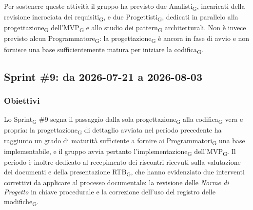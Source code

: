 ﻿\documentclass[a4paper, 10pt, colorlinks=true, linkcolor=black, urlcolor=blue, citecolor=blue, hidelinks]{article}
\begin{document}
Per sostenere queste attività il gruppo ha previsto due Analisti\textsubscript{G}, incaricati della revisione incrociata dei requisiti\textsubscript{G}, e due Progettisti\textsubscript{G}, dedicati in parallelo alla progettazione\textsubscript{G} dell'MVP\textsubscript{G} e allo studio dei pattern\textsubscript{G} architetturali. Non è invece previsto alcun Programmatore\textsubscript{G}: la progettazione\textsubscript{G} è ancora in fase di avvio e non fornisce una base sufficientemente matura per iniziare la codifica\textsubscript{G}.

\subsection{Sprint \#9: da 2026-07-21 a 2026-08-03}

\subsubsection{Obiettivi}
Lo Sprint\textsubscript{G} \#9 segna il passaggio dalla sola progettazione\textsubscript{G} alla codifica\textsubscript{G} vera e propria: la progettazione\textsubscript{G} di dettaglio avviata nel periodo precedente ha raggiunto un grado di maturità sufficiente a fornire ai Programmatori\textsubscript{G} una base implementabile, e il gruppo avvia pertanto l'implementazione\textsubscript{G} dell'MVP\textsubscript{G}. Il periodo è inoltre dedicato al recepimento dei riscontri ricevuti sulla valutazione dei documenti e della presentazione RTB\textsubscript{G}, che hanno evidenziato due interventi correttivi da applicare al processo documentale: la revisione delle \textit{Norme di Progetto} in chiave procedurale e la correzione dell'uso del registro delle modifiche\textsubscript{G}.
\end{document}
